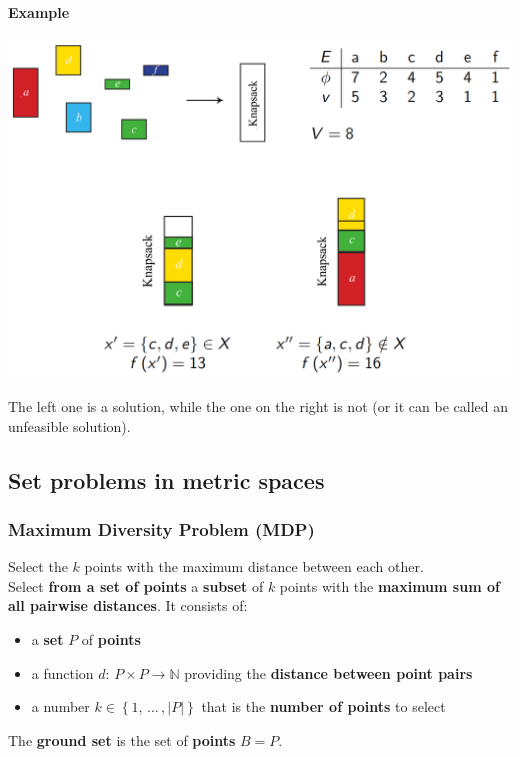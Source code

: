 \paragraph{Example} 	
\begin{center}
	\includegraphics[width=\columnwidth]{img/KP1}
\end{center}
The left one is a solution, while the one on the right is not (or it can be called an unfeasible solution).

\newpage

\subsection{Set problems in metric spaces}
\subsubsection{Maximum Diversity Problem (MDP)}
Select the $k$ points with the maximum distance between each other.\\ 
Select \textbf{from a set of points} a \textbf{subset} of $k$ points with the\textbf{ maximum sum of all pairwise distances}. It consists of: 
\begin{itemize}
	\item a \textbf{set} $P$ of \textbf{points}
	\item a function $d: \, P \times P \rightarrow \mathbb{N}$ providing the \textbf{distance between point pairs}
	\item a number $k \in \left\{1, \, ... \, , |P| \right\}$ that is the \textbf{number of points} to select
\end{itemize}

The \textbf{ground set} is the set of \textbf{points} $B = P$.\\

